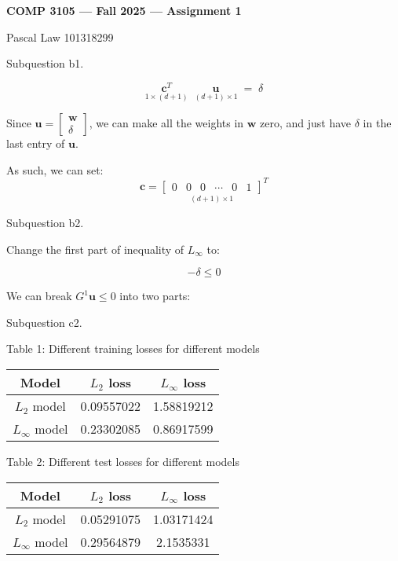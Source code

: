 \documentclass[12pt]{article}
\newcounter{ques}
\newenvironment{question}{\stepcounter{ques}{\noindent\bf Question \arabic{ques}:}}{\vspace{5mm}}
\begin{document}
 

\begin{center} \Large\bf
COMP 3105 --- Fall 2025 --- Assignment 1
\end{center} 

\begin{center}
Pascal Law 101318299
\end{center}

\begin{question}

Subquestion b1.

\[
\underset{1\times(d+1)}{\mathbf{c}^T}
\;\;
\underset{(d+1)\times 1}{\mathbf{u}}
\;=\; \delta
\]

Since $\mathbf{u} =
\begin{bmatrix}
\mathbf{w} \\
\delta
\end{bmatrix}
$, we can make all the weights in $\mathbf{w}$ zero, and just have $\delta$ in the last entry of $\mathbf{u}$.

As such, we can set:
\[
\mathbf{c} =
\underset{(d+1)\times 1}{
\begin{bmatrix}
0 & 0 & 0 & \cdots & 0 & 1
\end{bmatrix}}^{T}
\]

\quad

Subquestion b2. 

Change the first part of inequality of $L_{\infty}$ to:

\[-\delta \le 0\]

We can break $G^1 \mathbf{u} \le 0$ into two parts:

\quad



\quad

Subquestion c2.

\begin{center}
Table 1: Different training losses for different models
\end{center}
\begin{table}[h]
\centering
\begin{tabular}{c|cc}
    \textbf{Model} & $L_2$ loss & $L_\infty$ loss \\
    \hline
    $L_2$ model   &      0.09557022      &         1.58819212        \\
    $L_\infty$ model &      0.23302085      &           0.86917599      
\end{tabular}
\end{table}

\begin{center}
Table 2: Different test losses for different models
\end{center}
\begin{table}[h]
\centering
\begin{tabular}{c|cc}
    \textbf{Model} & $L_2$ loss & $L_\infty$ loss \\
    \hline
    $L_2$ model   &      0.05291075      &        1.03171424         \\
    $L_\infty$ model &      0.29564879      &         2.1535331        
\end{tabular}
\end{table}


\end{question}
\end{document}
